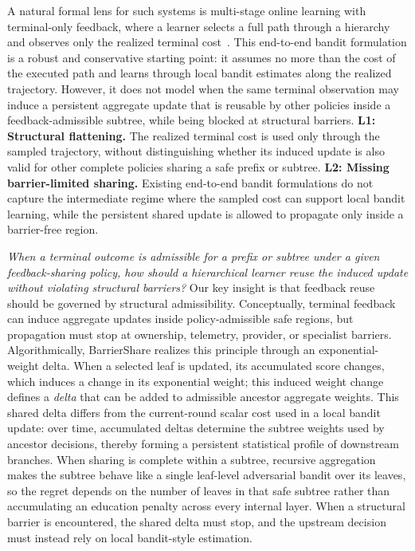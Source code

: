 A natural formal lens for such systems is multi-stage online learning with terminal-only feedback, where a learner selects a full path through a hierarchy and observes only the realized terminal cost~\cite{hou2024distributed}.
This end-to-end bandit formulation is a robust and conservative starting point: it assumes no more than the cost of the executed path and learns through local bandit estimates along the realized trajectory.
However, it does not model when the same terminal observation may induce a persistent aggregate update that is reusable by other policies inside a feedback-admissible subtree, while being blocked at structural barriers.
\textbf{L1: Structural flattening.}
The realized terminal cost is used only through the sampled trajectory, without distinguishing whether its induced update is also valid for other complete policies sharing a safe prefix or subtree.
\textbf{L2: Missing barrier-limited sharing.}
Existing end-to-end bandit formulations do not capture the intermediate regime where the sampled cost can support local bandit learning, while the persistent shared update is allowed to propagate only inside a barrier-free region.

\emph{When a terminal outcome is admissible for a prefix or subtree under a given feedback-sharing policy, how should a hierarchical learner reuse the induced update without violating structural barriers?}
Our key insight is that feedback reuse should be governed by structural admissibility.
Conceptually, terminal feedback can induce aggregate updates inside policy-admissible safe regions, but propagation must stop at ownership, telemetry, provider, or specialist barriers.
Algorithmically, BarrierShare realizes this principle through an exponential-weight delta.
When a selected leaf is updated, its accumulated score changes, which induces a change in its exponential weight; this induced weight change defines a \emph{delta} that can be added to admissible ancestor aggregate weights.
This shared delta differs from the current-round scalar cost used in a local bandit update: over time, accumulated deltas determine the subtree weights used by ancestor decisions, thereby forming a persistent statistical profile of downstream branches.
When sharing is complete within a subtree, recursive aggregation makes the subtree behave like a single leaf-level adversarial bandit over its leaves, so the regret depends on the number of leaves in that safe subtree rather than accumulating an education penalty across every internal layer.
When a structural barrier is encountered, the shared delta must stop, and the upstream decision must instead rely on local bandit-style estimation.

